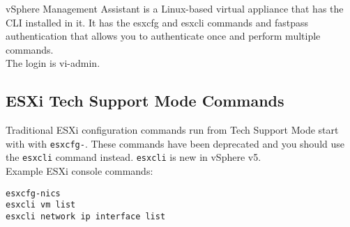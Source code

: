 vSphere Management Assistant is a Linux-based virtual appliance that has
the CLI installed in it. It has the esxcfg and esxcli commands and fastpass
authentication that allows you to authenticate once and perform multiple
commands.\\

The login is vi-admin.

\subsection{ESXi Tech Support Mode Commands}

Traditional ESXi configuration commands run from Tech Support Mode start with
with \texttt{esxcfg-}. These commands have been deprecated and you should
use the \texttt{esxcli} command instead. \texttt{esxcli} is new in vSphere
v5.\\

Example ESXi console commands:

\begin{verbatim}
esxcfg-nics
esxcli vm list
esxcli network ip interface list
\end{verbatim}
